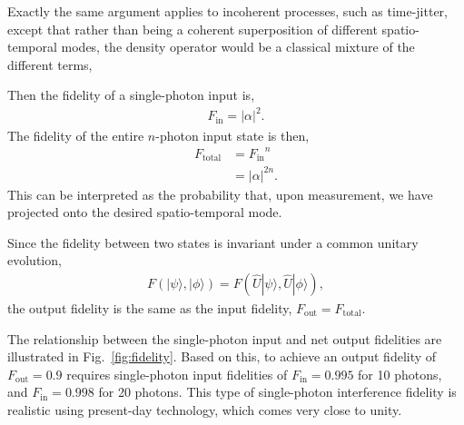 \documentclass[aps,pra,twocolumn,amsmath,amssymb,nofootinbib,superscriptaddress]{revtex4}
\newcommand{\ket}[1]{|#1\rangle}
\begin{document}
Exactly the same argument applies to incoherent processes, such as time-jitter, except that rather than being a coherent superposition of different spatio-temporal modes, the density operator would be a classical mixture of the different terms,

Then the fidelity of a single-photon input is,
\begin{align}
F_\mathrm{in} = |\alpha|^2.
\end{align}
The fidelity of the entire $n$-photon input state is then,
\begin{align}
F_\mathrm{total} &= {F_\mathrm{in}}^n \nonumber \\
&= |\alpha|^{2n}.
\end{align}
This can be interpreted as the probability that, upon measurement, we have projected onto the desired spatio-temporal mode.

Since the fidelity between two states is invariant under a common unitary evolution,
\begin{align}
F(\ket\psi,\ket\phi) = F(\hat{U}\ket\psi, \hat{U}\ket\phi),
\end{align}
the output fidelity is the same as the input fidelity, \mbox{$F_\mathrm{out} = F_\mathrm{total}$}.

The relationship between the single-photon input and net output fidelities are illustrated in Fig.~\ref{fig:fidelity}. Based on this, to achieve an output fidelity of \mbox{$F_\mathrm{out} = 0.9$} requires single-photon input fidelities of \mbox{$F_\mathrm{in} = 0.995$} for 10 photons, and \mbox{$F_\mathrm{in} = 0.998$} for 20 photons. This type of single-photon interference fidelity is realistic using present-day technology, which comes very close to unity.
\end{document}
